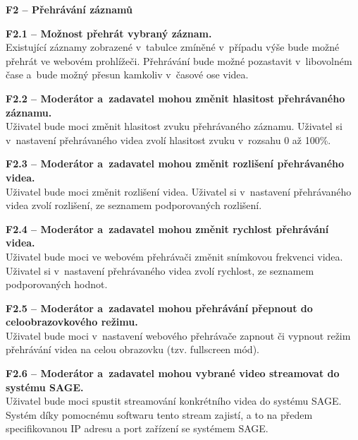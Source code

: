 \documentclass[thesis=M,czech]{FITthesis}[2012/06/26]
\begin{document}
\begin{description}
  \item \textbf{F2 -- Přehrávání záznamů}
  \begin{description}
    \item \textbf{F2.1 -- Možnost přehrát vybraný záznam.\\}
    Existující záznamy zobrazené v~tabulce zmíněné v~případu výše bude možné přehrát ve webovém prohlížeči. Přehrávání bude možné pozastavit v~libovolném čase a~bude možný přesun kamkoliv v~časové ose videa.
    \item \textbf{F2.2 -- Moderátor a~zadavatel mohou změnit hlasitost přehrávaného záznamu.\\}
	Uživatel bude moci změnit hlasitost zvuku přehrávaného záznamu. Uživatel si v~nastavení přehrávaného videa zvolí hlasitost zvuku v~rozsahu 0 až 100\%.
    \item \textbf{F2.3 -- Moderátor a~zadavatel mohou změnit rozlišení přehrávaného videa.\\}
    Uživatel bude moci změnit rozlišení videa. Uživatel si v~nastavení přehrávaného videa zvolí rozlišení, ze seznamem podporovaných rozlišení.
    \item \textbf{F2.4 -- Moderátor a~zadavatel mohou změnit rychlost přehrávání videa.\\}
    Uživatel bude moci ve webovém přehrávači změnit snímkovou frekvenci videa. Uživatel si v~nastavení přehrávaného videa zvolí rychlost, ze seznamem podporovaných hodnot.
    \item \textbf{F2.5 -- Moderátor a~zadavatel mohou přehrávání přepnout do celoobrazovkového režimu.\\}
    Uživatel bude moci v~nastavení webového přehrávače zapnout či vypnout režim přehrávání videa na celou obrazovku (tzv. fullscreen mód).
    \item \textbf{F2.6 -- Moderátor a~zadavatel mohou vybrané video streamovat do systému SAGE.\\}
	Uživatel bude moci spustit streamování konkrétního videa do systému SAGE. Systém díky pomocnému softwaru tento stream zajistí, a to na předem specifikovanou IP adresu a port zařízení se systémem SAGE.
  \end{description}


\end{description}
\end{document}
